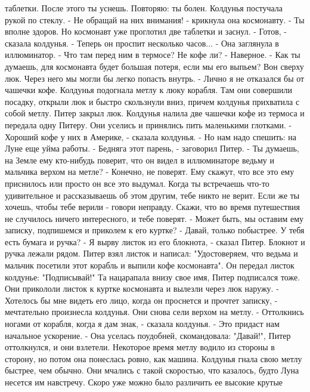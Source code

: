 таблетки. После этого ты уснешь. Повторяю: ты болен.
    Колдунья постучала рукой по стеклу.
    - Не обращай на них внимания! - крикнула она космонавту. - Ты 
вполне здоров.
    Но космонавт уже проглотил две таблетки и заснул.
    - Готов, - сказала колдунья. - Теперь он проспит несколько 
часов... - Она заглянула в иллюминатор. - Что там перед ним в термосе? 
Не кофе ли?
    - Наверное.
    - Как ты думаешь, для космонавта будет большая потеря, если мы его 
выпьем? Вон сверху люк. Через него мы могли бы легко попасть внутрь.
    - Лично я не отказался бы от чашечки кофе.
    Колдунья подогнала метлу к люку корабля. Там они совершили 
посадку, открыли люк и быстро скользнули вниз, причем колдунья 
прихватила с собой метлу. Питер закрыл люк. Колдунья налила две 
чашечки кофе из термоса и передала одну Питеру. Они уселись и 
принялись пить маленькими глотками.
    - Хороший кофе у них в Америке, - сказала колдунья. - Но нам надо 
спешить: на Луне еще уйма работы.
    - Бедняга этот парень, - заговорил Питер. - Ты думаешь, на Земле 
ему кто-нибудь поверит, что он видел в иллюминаторе ведьму и мальчика 
верхом на метле?
    - Конечно, не поверят. Ему скажут, что все это ему приснилось или 
просто он все это выдумал. Когда ты встречаешь что-то удивительное и 
рассказываешь об этом другим, тебе никто не верит. Если же ты хочешь, 
чтобы тебе верили - говори неправду. Скажи, что во время путешествия 
не случилось ничего интересного, и тебе поверят.
    - Может быть, мы оставим ему записку, подпишемся и приколем к его 
куртке?
    - Давай, только побыстрее. У тебя есть бумага и ручка?
    - Я вырву листок из его блокнота, - сказал Питер. Блокнот и ручка 
лежали рядом.
    Питер взял листок и написал: "Удостоверяем, что ведьма и мальчик 
посетили этот корабль и выпили кофе космонавта".
    Он передал листок колдунье: "Подписывай!" Та нацарапала внизу свое 
имя, Питер подписался тоже. Они прикололи листок к куртке космонавта и 
вылезли через люк наружу.
    - Хотелось бы мне видеть его лицо, когда он проснется и прочтет 
записку, - мечтательно произнесла колдунья.
    Они снова сели верхом на метлу.
    - Оттолкнись ногами от корабля, когда я дам знак, - сказала 
колдунья. - Это придаст нам начальное ускорение. - Она уселась 
поудобней, скомандовала: "Давай!", Питер оттолкнулся, и они взлетели.
    Некоторое время метлу водило из стороны в сторону, но потом она 
понеслась ровно, как машина. Колдунья гнала свою метлу быстрее, чем 
обычно. Они мчались с такой скоростью, что казалось, будто Луна 
несется им навстречу. Скоро уже можно было различить ее высокие крутые 
